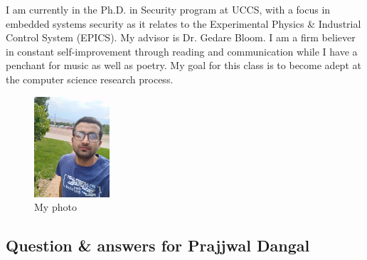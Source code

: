 I am currently in the Ph.D. in Security program at UCCS, with a focus in embedded systems security as it relates to the Experimental Physics \& Industrial Control System (EPICS). My advisor is Dr. Gedare Bloom. I am a firm believer in constant self-improvement through reading and communication while I have a penchant for music as well as poetry. My goal for this class is to become adept at the computer science research process.


\begin{figure} [h]
    \captionsetup{justification=centering}
    \centering
    \includegraphics [width= 0.25\textwidth] {Dangal-UCCS}
    \caption{My photo}
    \label{fig:my_label}
\end{figure}

%

\subsection{Question \& answers for Prajjwal Dangal}







    
    
